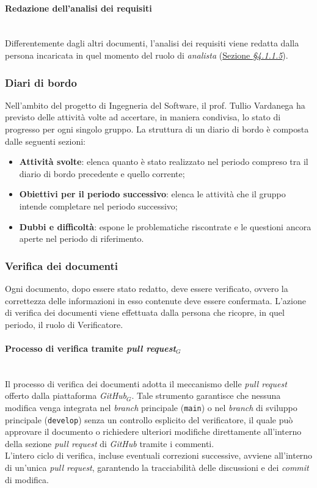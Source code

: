 \documentclass[10pt, letterpaper]{article}
\newcommand{\trisubsection}[1]{\paragraph{#1}\mbox{}\\}
\begin{document}
\trisubsection{Redazione dell'analisi dei requisiti}
Differentemente dagli altri documenti, l'analisi dei requisiti viene redatta dalla persona incaricata in quel momento del ruolo di
\textit{analista} (\hyperref[sec:Analista]{Sezione \textit{§4.1.1.5}}).

\subsubsection{Diari di bordo}
Nell'ambito del progetto di Ingegneria del Software, il prof. Tullio Vardanega 
ha previsto delle attività volte ad accertare, in maniera condivisa, lo stato 
di progresso per ogni singolo gruppo. La struttura di un diario di bordo è 
composta dalle seguenti sezioni:
\begin{itemize}
    \item \textbf{Attività svolte}: elenca quanto è stato realizzato nel 
    periodo compreso tra il diario di bordo precedente e quello corrente;
    \item \textbf{Obiettivi per il periodo successivo}: elenca le attività 
    che il gruppo intende completare nel periodo successivo;
    \item \textbf{Dubbi e difficoltà}: espone le problematiche riscontrate 
    e le questioni ancora aperte nel periodo di riferimento.
\end{itemize}

\subsubsection{Verifica dei documenti}
Ogni documento, dopo essere stato redatto, deve essere verificato, ovvero la correttezza delle informazioni in esso contenute deve essere confermata.
L'azione di verifica dei documenti viene effettuata dalla persona che ricopre, in quel periodo, il ruolo di Verificatore.

\label{sec:Verifica}
\trisubsection{Processo di verifica tramite \textit{pull request$_G$}}
\label{sec:Verifica_doc}
Il processo di verifica dei documenti adotta il meccanismo delle \textit{pull request} offerto dalla piattaforma \textit{GitHub}${_G}$.
Tale strumento garantisce che nessuna modifica venga integrata nel \textit{branch} principale (\texttt{main}) o nel \textit{branch} di sviluppo principale (\texttt{develop}) senza un controllo esplicito del verificatore,
il quale può approvare il documento o richiedere ulteriori modifiche direttamente all'interno della sezione \textit{pull request} di \textit{GitHub} tramite i commenti. \\
L'intero ciclo di verifica, incluse eventuali correzioni successive, avviene all'interno di un'unica \textit{pull request},
garantendo la tracciabilità delle discussioni e dei \textit{commit} di modifica. \\
\end{document}
